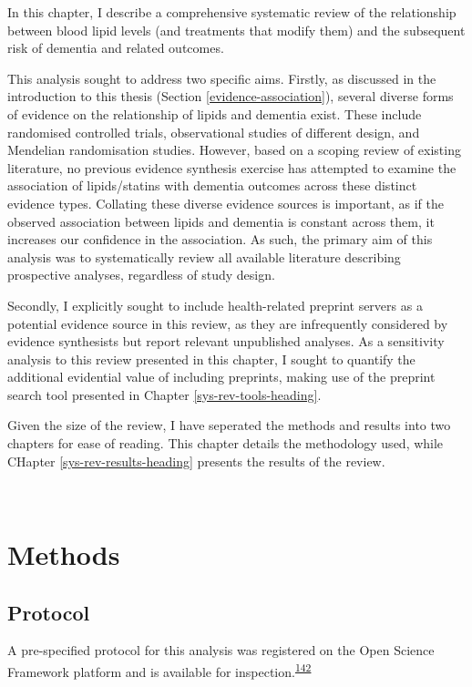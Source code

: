 \documentclass[a4paper, twoside]{templates/ociamthesis}
\begin{document}
In this chapter, I describe a comprehensive systematic review of the relationship between blood lipid levels (and treatments that modify them) and the subsequent risk of dementia and related outcomes.

This analysis sought to address two specific aims. Firstly, as discussed in the introduction to this thesis (Section \ref{evidence-association}), several diverse forms of evidence on the relationship of lipids and dementia exist. These include randomised controlled trials, observational studies of different design, and Mendelian randomisation studies. However, based on a scoping review of existing literature, no previous evidence synthesis exercise has attempted to examine the association of lipids/statins with dementia outcomes across these distinct evidence types. Collating these diverse evidence sources is important, as if the observed association between lipids and dementia is constant across them, it increases our confidence in the association. As such, the primary aim of this analysis was to systematically review all available literature describing prospective analyses, regardless of study design.

Secondly, I explicitly sought to include health-related preprint servers as a potential evidence source in this review, as they are infrequently considered by evidence synthesists but report relevant unpublished analyses. As a sensitivity analysis to this review presented in this chapter, I sought to quantify the additional evidential value of including preprints, making use of the preprint search tool presented in Chapter \ref{sys-rev-tools-heading}.

Given the size of the review, I have seperated the methods and results into two chapters for ease of reading. This chapter details the methodology used, while CHapter \ref{sys-rev-results-heading} presents the results of the review.

~

\hypertarget{methods}{%
\section{Methods}\label{methods}}

\hypertarget{protocol}{%
\subsection{Protocol}\label{protocol}}

A pre-specified protocol for this analysis was registered on the Open Science Framework platform and is available for inspection.\textsuperscript{\protect\hyperlink{ref-mcguinnessluke2020}{142}}
\end{document}
